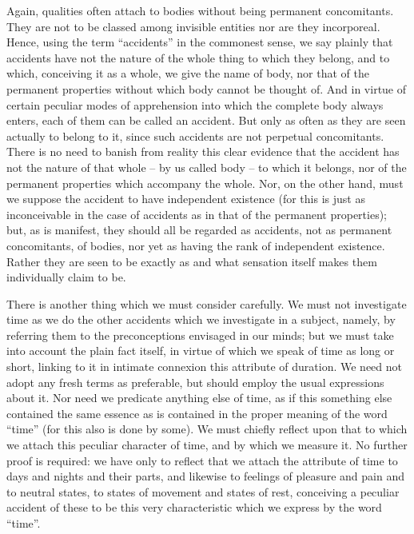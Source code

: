 \documentclass{stex}
\begin{document}
Again, qualities often attach to bodies without being permanent concomitants.
They are not to be classed among invisible entities nor are they incorporeal.
Hence, using the term \enquote{accidents} in the commonest sense, we say plainly that accidents have not the nature of the whole thing to which they belong, and to which, conceiving it as a whole, we give the name of body, nor that of the permanent properties without which body cannot be thought of.
And in virtue of certain peculiar modes of apprehension into which the complete body always enters, each of them can be called an accident.
But only as often as they are seen actually to belong to it, since such accidents are not perpetual concomitants.
There is no need to banish from reality this clear evidence that the accident has not the nature of that whole – by us called body – to which it belongs, nor of the permanent properties which accompany the whole.
Nor, on the other hand, must we suppose the accident to have independent existence (for this is just as inconceivable in the case of accidents as in that of the permanent properties); but, as is manifest, they should all be regarded as accidents, not as permanent concomitants, of bodies, nor yet as having the rank of independent existence.
Rather they are seen to be exactly as and what sensation itself makes them individually claim to be.

There is another thing which we must consider carefully.
We must not investigate time as we do the other accidents which we investigate in a subject, namely, by referring them to the preconceptions envisaged in our minds; but we must take into account the plain fact itself, in virtue of which we speak of time as long or short, linking to it in intimate connexion this attribute of duration.
We need not adopt any fresh terms as preferable, but should employ the usual expressions about it.
Nor need we predicate anything else of time, as if this something else contained the same essence as is contained in the proper meaning of the word \enquote{time} (for this also is done by some).
We must chiefly reflect upon that to which we attach this peculiar character of time, and by which we measure it.
No further proof is required: we have only to reflect that we attach the attribute of time to days and nights and their parts, and likewise to feelings of pleasure and pain and to neutral states, to states of movement and states of rest, conceiving a peculiar accident of these to be this very characteristic which we express by the word \enquote{time}.
\end{document}
